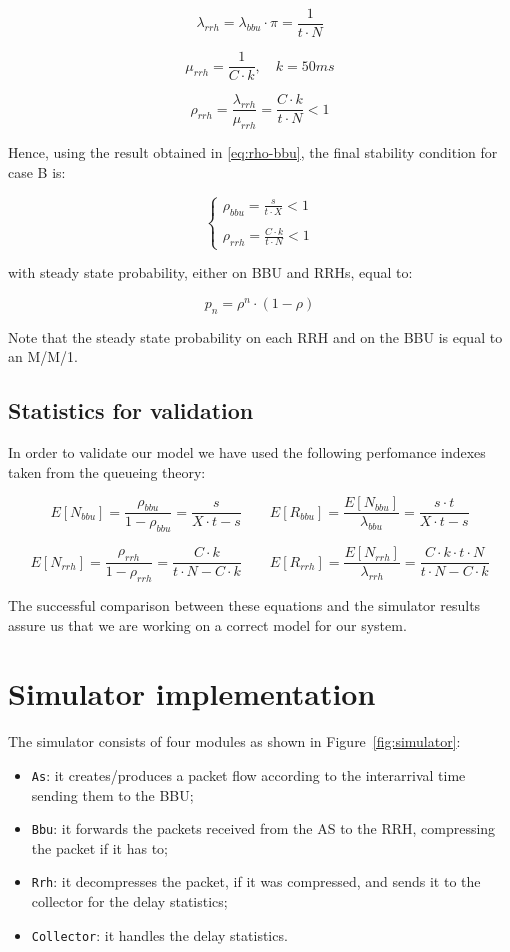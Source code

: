\documentclass[11pt,a4paper,oneside, openright]{article}
\begin{document}
$$ \lambda_{rrh} = \lambda_{bbu} \cdot \pi = \frac{1}{t \cdot N} $$

$$ \mu_{rrh} = \frac{1}{C \cdot k}, \quad k = 50ms $$

\begin{equation} \label{eq:rho-rrh}
\rho_{rrh} = \frac{\lambda_{rrh}}{\mu_{rrh}} = \frac{C \cdot k}{t \cdot N} < 1
\end{equation}

Hence, using the result obtained in \ref{eq:rho-bbu}, the final stability condition for case B is:

$$ \begin{cases} \rho_{bbu} = \frac{s}{t \cdot X} < 1 \\ \\ \rho_{rrh} = \frac{C \cdot k}{t \cdot N} < 1 \end{cases} $$

with steady state probability, either on BBU and RRHs, equal to:

$$ p_{n} = \rho^n \cdot (1 - \rho) $$

Note that the steady state probability on each RRH and on the BBU is equal to an M/M/1.

\subsection{Statistics for validation}
In order to validate our model we have used the following perfomance indexes taken from the queueing theory:

$$ E[N_{bbu}] = \frac{\rho_{bbu}}{1 - \rho_{bbu}} = \frac{s}{X \cdot t - s} \qquad E[R_{bbu}] = \frac{E[N_{bbu}]}{\lambda_{bbu}} =  \frac{s \cdot t}{X \cdot t - s}$$

$$ E[N_{rrh}] = \frac{\rho_{rrh}}{1 - \rho_{rrh}} = \frac{C \cdot k}{t \cdot N - C \cdot k} \qquad E[R_{rrh}] = \frac{E[N_{rrh}]}{\lambda_{rrh}} = \frac{C \cdot k \cdot t \cdot N}{t \cdot N - C \cdot k}$$

The successful comparison between these equations and the simulator results assure us that we are working on a correct model for our system.

\section{Simulator implementation}
The simulator consists of four modules as shown in Figure~\ref{fig:simulator}:
\begin{itemize}
  \item \texttt{As}: it creates/produces a packet flow according to the interarrival time sending them to the BBU;
  \item \texttt{Bbu}: it forwards the packets received from the AS to the RRH, compressing the packet if it has to;
  \item \texttt{Rrh}: it decompresses the packet, if it was compressed, and sends it to the collector for the delay statistics;
  \item \texttt{Collector}: it handles the delay statistics.
\end{itemize}
\end{document}
